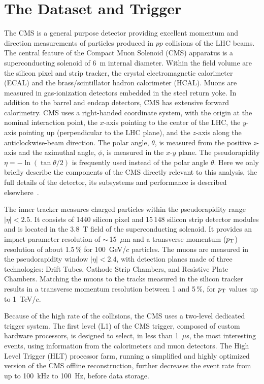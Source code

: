 \section{The Dataset and Trigger}

The CMS is a general purpose detector providing excellent momentum and direction measurements of particles produced in $pp$ collisions of the LHC beams. The central feature of the Compact Muon Solenoid (CMS) apparatus is a superconducting solenoid of 6~m internal diameter. Within the field volume are the silicon pixel and strip tracker, the crystal electromagnetic calorimeter (ECAL) and the brass/scintillator hadron calorimeter (HCAL). Muons are measured in gas-ionization detectors embedded in the steel return yoke. In addition to the barrel and endcap detectors, CMS has extensive forward calorimetry. CMS uses a right-handed coordinate system, with the origin at the nominal interaction point, the $x$-axis pointing to the center of the LHC, the $y$-axis pointing up (perpendicular to the LHC plane), and the $z$-axis along the anticlockwise-beam direction. The polar angle, $\theta$, is measured from the positive $z$-axis and the azimuthal angle, $\phi$, is measured in the $x$-$y$ plane. The pseudorapidity $\eta=- \ln{(\tan{\theta/2})}$ is frequently used instead of the polar angle $\theta$. Here we only briefly describe the components of the CMS directly relevant to this analysis, the full details of the detector, its subsystems and performance is described elsewhere~\cite{CMS}. 

The inner tracker measures charged particles within the pseudorapidity range $|\eta| < 2.5$. It consists of 1440 silicon pixel and 15\,148 silicon strip detector modules and is located in the 3.8~T field of the superconducting solenoid. It provides an impact parameter resolution of $\sim$\,15~$\mu$m and a transverse momentum ($p_{\rm T}$) resolution of about 1.5\,\% for 100~GeV/$c$ particles. The muons are measured in the pseudorapidity window $|\eta|< 2.4$, with detection planes made of three technologies: Drift Tubes, Cathode Strip Chambers, and Resistive Plate Chambers. Matching the muons to the tracks measured in the silicon tracker results in a transverse momentum resolution between 1 and 5\,\%, for $p_{\rm T}$ values up to 1~TeV/$c$. 

Because of the high rate of the collisions, the CMS uses a two-level dedicated trigger system. The first level (L1) of the CMS trigger, composed of custom hardware processors, is designed to select, in less than 1~$\mu$s, the most interesting events, using information from the calorimeters and muon detectors. The High Level Trigger (HLT) processor farm, running a simplified and highly optimized version of the CMS offline reconstruction, further decreases the event rate from up to 100~kHz to 100~Hz, before data storage.

